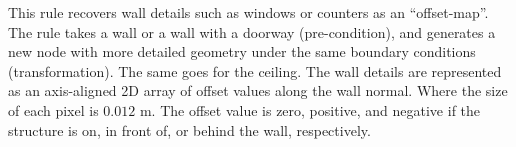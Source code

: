 
 This rule recovers
wall details such as windows or counters as an ``offset-map''.
The rule takes a wall or a wall with a doorway (pre-condition), and
generates a new node with more detailed geometry under the same boundary
conditions (transformation). The same goes for the ceiling.
%
The wall details are represented as an axis-aligned 2D array of offset
values along the wall normal. Where the size of each pixel is $0.012$
m. The offset value is zero, positive, and negative if the structure is
on, in front of, or behind the wall, respectively.

